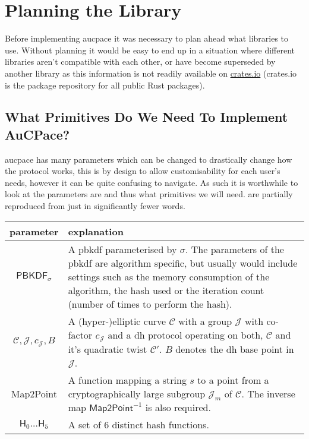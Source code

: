 \section{Planning the Library}
Before implementing \gls{aucpace} it was necessary to plan ahead what libraries to use.
Without planning it would be easy to end up in a situation where different libraries aren't compatible with each other, or have become superseded by another library as this information is not readily available on \href{https://crates.io/}{crates.io} (crates.io is the package repository for all public Rust packages).

\subsection{What Primitives Do We Need To Implement AuCPace?}
\gls{aucpace} has many parameters which can be changed to drastically change how the protocol works, this is by design to allow customisability for each user's needs, however it can be quite confusing to navigate.
As such it is worthwhile to look at the parameters are and thus what primitives we will need.
 are partially reproduced from \cite{aucpace} just in significantly fewer words.

\begin{center}
  \label{tab:aucpace-params}
  \begin{tabularx}{\linewidth}{ cX }
    \toprule
    parameter & explanation \\
    \midrule
    $\textsf{PBKDF}_{\sigma}$ & A \gls{pbkdf} parameterised by $\sigma$.
    The parameters of the \gls{pbkdf} are algorithm specific, but usually would include settings such as the memory consumption of the algorithm, the hash used or the iteration count (number of times to perform the hash). \\
    $\mathcal{C}, \mathcal{J}, c_{\mathcal{J}}, B$ & A (hyper-)elliptic curve $\mathcal{C}$ with a group $\mathcal{J}$ with co-factor $c_{\mathcal{J}}$ and a \gls{dh} protocol operating on both, $\mathcal{C}$ and it's quadratic twist $\mathcal{C}'$. $B$ denotes the \gls{dh} base point in $\mathcal{J}$.\\
    \textsf{Map2Point} & A function mapping a string $s$ to a point from a cryptographically large subgroup $\mathcal{J}_m$ of $\mathcal{C}$. The inverse map $\textsf{Map2Point}^{-1}$ is also required.\\
    $\textsf{H}_0 \dots \textsf{H}_5$ & A set of 6 distinct hash functions.\\
    \bottomrule
  \end{tabularx}
\end{center}

